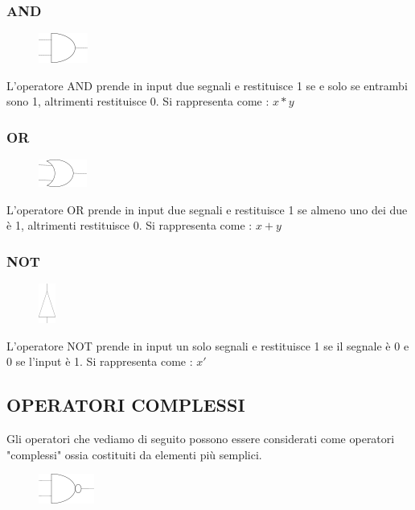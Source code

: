 \documentclass[a4paper]{book}
\begin{document}
\subsubsection*{AND}
\begin{figure}
\includegraphics{AndPrecisa}
\end{figure}
L'operatore AND prende in input  due segnali e restituisce 1 se e solo se entrambi sono 1, altrimenti restituisce 0.
\newline Si rappresenta come : \(x*y\)\newline


\subsubsection*{OR}
\begin{figure}
\includegraphics{OrGate}
\end{figure}
L'operatore OR prende in input due segnali e restituisce 1 se almeno uno dei due è 1, altrimenti restituisce 0.
\newline Si rappresenta come : \(x+y\)\newline
\subsubsection*{NOT}
\begin{figure}
\includegraphics{NotGate}
\end{figure}
L'operatore NOT prende in input un solo segnali e restituisce 1 se il segnale è 0 e 0 se l'input è 1.
\newline Si rappresenta come : \(x'\)

\newpage
\subsection{OPERATORI COMPLESSI}
Gli operatori che vediamo di seguito possono essere considerati come operatori "complessi" ossia costituiti da elementi più semplici.
\begin{figure}
\includegraphics{NandGate}
\end{figure}
\end{document}
